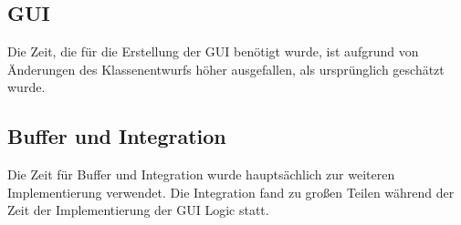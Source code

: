 \subsection{GUI}
Die Zeit, die f\"{u}r die Erstellung der GUI ben\"{o}tigt wurde, ist aufgrund von \"{A}nderungen des Klassenentwurfs h\"{o}her ausgefallen, als urspr\"{u}nglich gesch\"{a}tzt wurde.
\subsection{Buffer und Integration}
Die Zeit f\"{u}r Buffer und Integration wurde haupts\"{a}chlich zur weiteren Implementierung verwendet. Die Integration fand zu gro\ss en Teilen w\"{a}hrend der Zeit der Implementierung der GUI Logic statt.